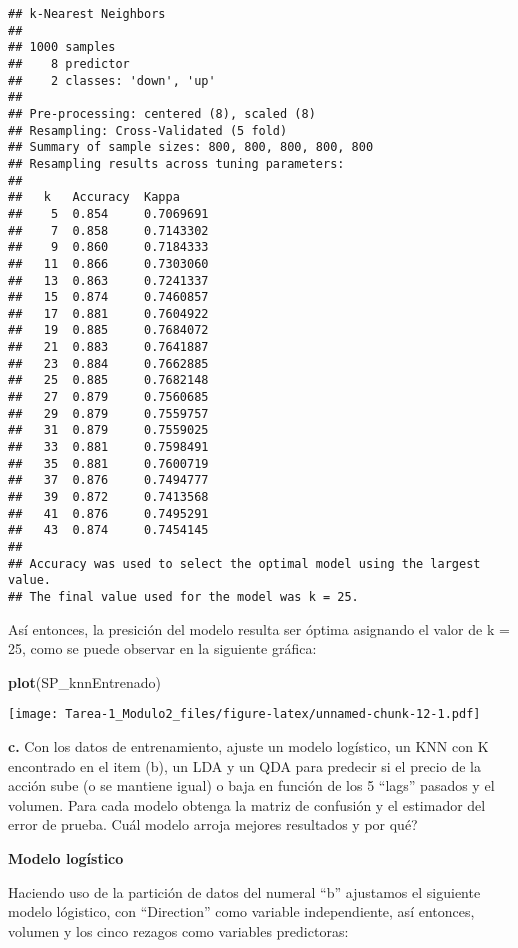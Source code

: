 \documentclass[
]{article}
\newenvironment{Shaded}{\begin{snugshade}}{\end{snugshade}}
\newcommand{\CommentTok}[1]{\textcolor[rgb]{0.56,0.35,0.01}{\textit{#1}}}
\newcommand{\DecValTok}[1]{\textcolor[rgb]{0.00,0.00,0.81}{#1}}
\newcommand{\KeywordTok}[1]{\textcolor[rgb]{0.13,0.29,0.53}{\textbf{#1}}}
\newcommand{\NormalTok}[1]{#1}
\newcommand{\OperatorTok}[1]{\textcolor[rgb]{0.81,0.36,0.00}{\textbf{#1}}}
\newcommand{\StringTok}[1]{\textcolor[rgb]{0.31,0.60,0.02}{#1}}
\begin{document}
\begin{verbatim}
## k-Nearest Neighbors 
## 
## 1000 samples
##    8 predictor
##    2 classes: 'down', 'up' 
## 
## Pre-processing: centered (8), scaled (8) 
## Resampling: Cross-Validated (5 fold) 
## Summary of sample sizes: 800, 800, 800, 800, 800 
## Resampling results across tuning parameters:
## 
##   k   Accuracy  Kappa    
##    5  0.854     0.7069691
##    7  0.858     0.7143302
##    9  0.860     0.7184333
##   11  0.866     0.7303060
##   13  0.863     0.7241337
##   15  0.874     0.7460857
##   17  0.881     0.7604922
##   19  0.885     0.7684072
##   21  0.883     0.7641887
##   23  0.884     0.7662885
##   25  0.885     0.7682148
##   27  0.879     0.7560685
##   29  0.879     0.7559757
##   31  0.879     0.7559025
##   33  0.881     0.7598491
##   35  0.881     0.7600719
##   37  0.876     0.7494777
##   39  0.872     0.7413568
##   41  0.876     0.7495291
##   43  0.874     0.7454145
## 
## Accuracy was used to select the optimal model using the largest value.
## The final value used for the model was k = 25.
\end{verbatim}

Así entonces, la presición del modelo resulta ser óptima asignando el
valor de k = 25, como se puede observar en la siguiente gráfica:

\begin{Shaded}
\begin{Highlighting}[]
\KeywordTok{plot}\NormalTok{(SP_knnEntrenado)}
\end{Highlighting}
\end{Shaded}

\texttt{[image: Tarea-1\_Modulo2\_files/figure-latex/unnamed-chunk-12-1.pdf]}

\textbf{c.} Con los datos de entrenamiento, ajuste un modelo logístico,
un KNN con K encontrado en el item (b), un LDA y un QDA para predecir si
el precio de la acción sube (o se mantiene igual) o baja en función de
los 5 ``lags'' pasados y el volumen. Para cada modelo obtenga la matriz
de confusión y el estimador del error de prueba. Cuál modelo arroja
mejores resultados y por qué?

\textbf{Modelo logístico}

Haciendo uso de la partición de datos del numeral ``b'' ajustamos el
siguiente modelo lógistico, con ``Direction'' como variable
independiente, así entonces, volumen y los cinco rezagos como variables
predictoras:

\begin{Shaded}
\end{Shaded}
\end{document}
